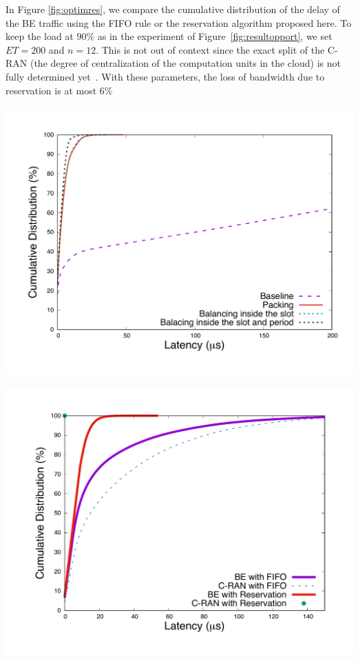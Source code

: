 \documentclass[10pt, conference, letterpaper]{IEEEtran}
\begin{document}
In Figure \ref{fig:optimres}, we compare the cumulative distribution of the delay of the BE traffic using the FIFO rule or the reservation algorithm proposed here. To keep the load at $90\%$ as in the experiment of  Figure~\ref{fig:resultopport}, we set $ET = 200$ and $n = 12$. This is not out of context since the exact split of the C-RAN (the degree of centralization of the computation units in the cloud) is not fully determined yet~\cite{mobile2011c}. With these parameters, the loss of bandwidth due to reservation is at most $6\%$

\begin{center}
      \includegraphics[scale=0.25]{repart1res}
      \label{fig:algocmp}

\vspace{0.5cm}

      \includegraphics[scale=0.25]{optim.pdf}
        \label{fig:optimres}

\end{center}
\end{document}
